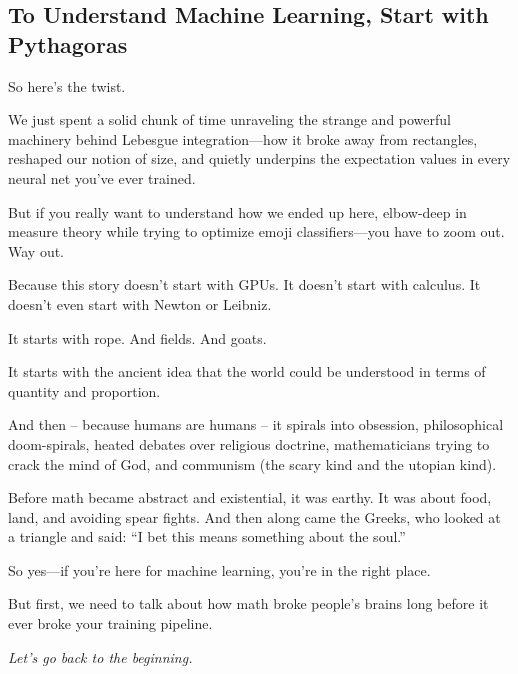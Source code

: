 \subsection{To Understand Machine Learning, Start with Pythagoras}

So here's the twist.

We just spent a solid chunk of time unraveling the strange and powerful machinery behind Lebesgue integration—how it broke away from rectangles, reshaped our notion of size, and quietly underpins the expectation values in every neural net you’ve ever trained.

But if you really want to understand how we ended up here, elbow-deep in measure theory while trying to optimize emoji classifiers—you have to zoom out. Way out.

Because this story doesn’t start with GPUs. It doesn’t start with calculus. It doesn’t even start with Newton or Leibniz.

It starts with rope. And fields. And goats.

It starts with the ancient idea that the world could be understood in terms of quantity and proportion.

And then -- because humans are humans -- it spirals into obsession, philosophical doom-spirals, heated debates over religious doctrine, mathematicians trying to crack the mind of God, and communism (the scary kind and the utopian kind).

Before math became abstract and existential, it was earthy. It was about food, land, and avoiding spear fights. And then along came the Greeks, who looked at a triangle and said: “I bet this means something about the soul.”

So yes—if you're here for machine learning, you’re in the right place.

But first, we need to talk about how math broke people's brains long before it ever broke your training pipeline.

\textit{Let’s go back to the beginning.}